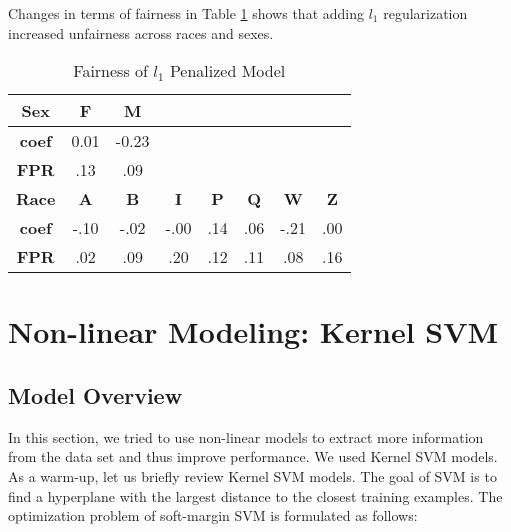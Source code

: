 Changes in terms of fairness in Table \ref{Table:Fairness metric-bal-l1} shows that adding $l_1$ regularization increased unfairness across races and sexes.

\begin{table}[htb]
\centering
\begin{tabular}{cccccccc}
\hline
\textbf{Sex} & \textbf{F} & \textbf{M} &            &            &            &            &            \\ \hline
\textbf{coef}   & 0.01        & -0.23        &            &            &            &            &            \\
\textbf{FPR}    & .13        & .09        &            &            &            &            &            \\ \hline
\textbf{Race }       & \textbf{A} & \textbf{B} & \textbf{I} & \textbf{P} & \textbf{Q} & \textbf{W} & \textbf{Z} \\ \hline
\textbf{coef}   & -.10         & -.02        & -.00       & .14        & .06         & -.21         & .00       \\
\textbf{FPR}    & .02        & .09       & .20        & .12        & .11        & .08        & .16   \\  \hline  
\end{tabular}
\caption{Fairness of $l_1$ Penalized Model}
    \label{Table:Fairness metric-bal-l1}
\end{table}

\section{Non-linear Modeling: Kernel SVM} \label{sec:non-linear}

\subsection{Model Overview}
In this section, we tried to use non-linear models to extract more information from the data set and thus improve performance. We used Kernel SVM models. 
As a warm-up, let us briefly review Kernel SVM models. The goal of SVM is to find a hyperplane with the largest distance to the closest training examples. The optimization problem of soft-margin SVM is formulated as follows:

